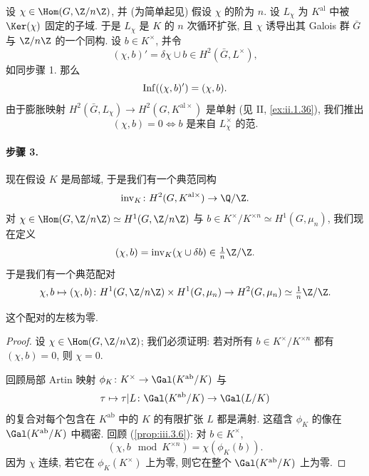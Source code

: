 设 $\chi\in\Hom(G,\Z/n\Z)$, 并 (为简单起见) 假设 $\chi$ 的阶为 $n$. 设 $L_\chi$ 为 $K^{\mathrm{al}}$ 中被 $\Ker(\chi)$ 固定的子域. 于是 $L_\chi$ 是 $K$ 的 $n$ 次循环扩张, 且 $\chi$ 诱导出其 Galois 群 $\bar G$ 与 $\Z/n\Z$ 的一个同构. 设 $b\in K^\times$, 并令
\[
 (\chi,b)'=\delta\chi\cup b\in H^2(\bar G,L^\times),
\]
如同步骤 1. 那么
\[
 \operatorname{Inf}((\chi,b)')=(\chi,b).
\]
由于膨胀映射 $H^2(\bar G,L_\chi)\to H^2(G,K^{\mathrm{al}\times})$ 是单射 (见 II, \ref{ex:ii.1.36}), 我们推出
\[
 (\chi,b)=0\iff b \text{ 是来自 } L_\chi^\times \text{ 的范}.
\]

\paragraph*{步骤 3.} 现在假设 $K$ 是局部域, 于是我们有一个典范同构
\[
 \inv_K\colon H^2(G,K^{\mathrm{al}\times})\to\Q/\Z.
\]
对 $\chi\in\Hom(G,\Z/n\Z)\simeq H^1(G,\Z/n\Z)$ 与 $b\in K^\times/K^{\times n}\simeq H^1(G,\mu_n)$, 我们现在定义
\[
 (\chi,b)=\inv_K(\chi\cup\delta b)\in\tfrac{1}{n}\Z/\Z.
\]
于是我们有一个典范配对
\[
 \chi,b\mapsto(\chi,b)\colon H^1(G,\Z/n\Z)\times H^1(G,\mu_n)\to H^2(G,\mu_n)\simeq\tfrac{1}{n}\Z/\Z.
\]

\begin{proposition}\label{prop:iii.4.3}
这个配对的左核为零.
\end{proposition}

\begin{proof}
设 $\chi\in\Hom(G,\Z/n\Z)$; 我们必须证明: 若对所有 $b\in K^\times/K^{\times n}$ 都有 $(\chi,b)=0$, 则 $\chi=0$.

回顾局部 Artin 映射 $\phi_K\colon K^\times\to\Gal(K^{\mathrm{ab}}/K)$ 与
\[
 \tau\mapsto\tau|L\colon \Gal(K^{\mathrm{ab}}/K)\to\Gal(L/K)
\]
的复合对每个包含在 $K^{\mathrm{ab}}$ 中的 $K$ 的有限扩张 $L$ 都是满射. 这蕴含 $\phi_K$ 的像在 $\Gal(K^{\mathrm{ab}}/K)$ 中稠密. 回顾 (\ref{prop:iii.3.6}): 对 $b\in K^\times$,
\[
 (\chi,b\mod K^{\times n})=\chi(\phi_K(b)).
\]
因为 $\chi$ 连续, 若它在 $\phi_K(K^\times)$ 上为零, 则它在整个 $\Gal(K^{\mathrm{ab}}/K)$ 上为零.
\end{proof}

